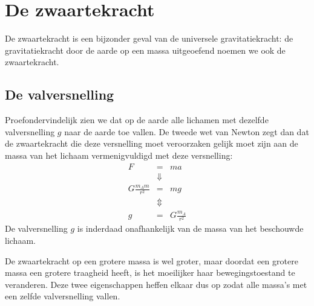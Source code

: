 \documentclass{ximera}
\begin{document}
	\author{Bart Lambregs}





	\section{De zwaartekracht}
	De zwaartekracht is een bijzonder geval van de universele gravitatiekracht: de gravitatiekracht door de aarde op een massa uitgeoefend noemen we ook de zwaartekracht.
	
	\subsection{De valversnelling}
	
	Proefondervindelijk zien we dat op de aarde alle lichamen met
	dezelfde valversnelling $g$ naar de aarde toe vallen. De tweede wet
	van Newton zegt dan dat de zwaartekracht die deze versnelling moet
	veroorzaken gelijk moet zijn aan de massa van het lichaam
	vermenigvuldigd met deze versnelling:
	\begin{eqnarray}
	F&=&ma\nonumber\\
	&\Downarrow&\nonumber\\
	G\frac{m_Am}{r^2}&=&mg\nonumber\\
	&\Updownarrow&\nonumber\\
	g&=&G\frac{m_A}{r^2}
	\end{eqnarray}
	De valversnelling $g$ is inderdaad onafhankelijk van de massa van
	het be\-schouw\-de lichaam.
	
	De zwaartekracht op een grotere massa is wel groter, maar doordat
	een grotere massa een grotere traagheid heeft, is het moeilijker haar
	bewegingstoestand te veranderen. Deze twee eigenschappen heffen
	elkaar dus op zodat alle massa's met een zelfde valversnelling vallen.
	
	
	
	
	
\end{document}
